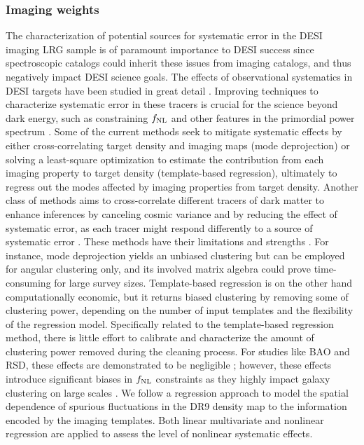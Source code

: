 \subsubsection{Imaging weights}
The characterization of potential sources for systematic error in the DESI imaging LRG sample is of paramount importance to DESI success since spectroscopic catalogs could inherit these issues from imaging catalogs, and thus negatively impact DESI science goals. The effects of observational systematics in DESI targets have been studied in great detail \cite[see, e.g.,][]{kitanidis2020imaging, zhou2021clustering, chaussidon2022angular}. Improving techniques to characterize systematic error in these tracers is crucial for the science beyond dark energy, such as constraining $f_{\rm NL}$ and other features in the primordial power spectrum \citep{beutler2019primordial}. Some of the current methods seek to mitigate systematic effects by either cross-correlating target density and imaging maps (mode deprojection) or solving a least-square optimization to estimate the contribution from each imaging property to target density (template-based regression), ultimately to regress out the modes affected by imaging properties from target density. Another class of methods aims to cross-correlate different tracers of dark matter to enhance inferences by canceling cosmic variance and by reducing the effect of systematic error, as each tracer might respond differently to a source of systematic error \citep[see, e.g.,][]{giannantonio2014improved}. These methods have their limitations and strengths \citep[see, e.g.,][for a review]{2021MNRAS.503.5061W}. For instance, mode deprojection yields an unbiased clustering but can be employed for angular clustering only, and its involved matrix algebra could prove time-consuming for large survey sizes. Template-based regression is on the other hand computationally economic, but it returns biased clustering by removing some of clustering power, depending on the number of input templates and the flexibility of the regression model. Specifically related to the template-based regression method, there is little effort to calibrate and characterize the amount of clustering power removed during the cleaning process. For studies like BAO and RSD, these effects are demonstrated to be negligible \citep{merz2021clustering}; however, these effects introduce significant biases in $f_{\rm NL}$ constraints \citep{mueller2022primordial} as they highly impact galaxy clustering on large scales \citep{rezaie2021primordial}. We follow a regression approach to model the spatial dependence of spurious fluctuations in the DR9 density map to the information encoded by the imaging templates. Both linear multivariate and nonlinear regression are applied to assess the level of nonlinear systematic effects. 

